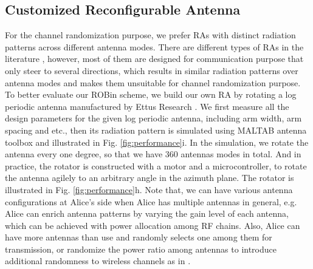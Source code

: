 \subsection{Customized Reconfigurable Antenna}
For the channel randomization purpose, we prefer RAs with distinct radiation patterns across different antenna modes. There are different types of RAs in the literature \cite{bernhard2007reconfigurable,LiBeamSteeringReconfigurableAntenna2015}, however, most of them are designed for communication purpose that only steer to several directions, which results in similar radiation patterns over antenna modes and makes them unsuitable for channel randomization purpose. To better evaluate our ROBin scheme, we build our own RA by rotating a log periodic antenna manufactured by Ettus Research \cite{antenna}. We first measure all the design parameters for the given log periodic antenna, including arm width, arm spacing and etc., then its radiation pattern is simulated using MALTAB antenna toolbox and illustrated in Fig. \ref{fig:performance}i. In the simulation, we rotate the antenna every one degree, so that we have 360 antennas modes in total. And in practice, the rotator is constructed with a motor and  a microcontroller, to rotate the antenna agilely to an arbitrary angle in the azimuth plane. The rotator is illustrated in Fig. \ref{fig:performance}h. Note that, we can have various antenna configurations at Alice's side when Alice has multiple antennas in general, e.g. Alice can enrich antenna patterns by varying the gain level of each antenna, which can be achieved with power allocation among RF chains. Also, Alice can have more antennas than use and randomly selects one among them for transmission, or randomize the power ratio among antennas to introduce additional randomness to wireless channels as in \cite{hassanieh2015securing}.



